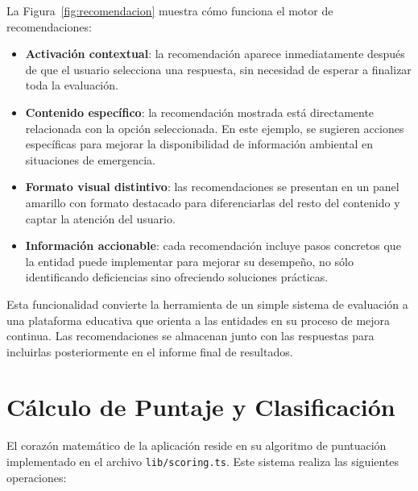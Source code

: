 \documentclass[12pt,a4paper]{report}
\begin{document}
La Figura~\ref{fig:recomendacion} muestra cómo funciona el motor de recomendaciones:
\begin{itemize}[leftmargin=*]
    \item \textbf{Activación contextual}: la recomendación aparece inmediatamente después de que el usuario selecciona una respuesta, sin necesidad de esperar a finalizar toda la evaluación.
    \item \textbf{Contenido específico}: la recomendación mostrada está directamente relacionada con la opción seleccionada. En este ejemplo, se sugieren acciones específicas para mejorar la disponibilidad de información ambiental en situaciones de emergencia.
    \item \textbf{Formato visual distintivo}: las recomendaciones se presentan en un panel amarillo con formato destacado para diferenciarlas del resto del contenido y captar la atención del usuario.
    \item \textbf{Información accionable}: cada recomendación incluye pasos concretos que la entidad puede implementar para mejorar su desempeño, no sólo identificando deficiencias sino ofreciendo soluciones prácticas.
\end{itemize}

Esta funcionalidad convierte la herramienta de un simple sistema de evaluación a una plataforma educativa que orienta a las entidades en su proceso de mejora continua. Las recomendaciones se almacenan junto con las respuestas para incluirlas posteriormente en el informe final de resultados.

\section{Cálculo de Puntaje y Clasificación}
El corazón matemático de la aplicación reside en su algoritmo de puntuación implementado en el archivo \texttt{lib/scoring.ts}. Este sistema realiza las siguientes operaciones:
\end{document}

